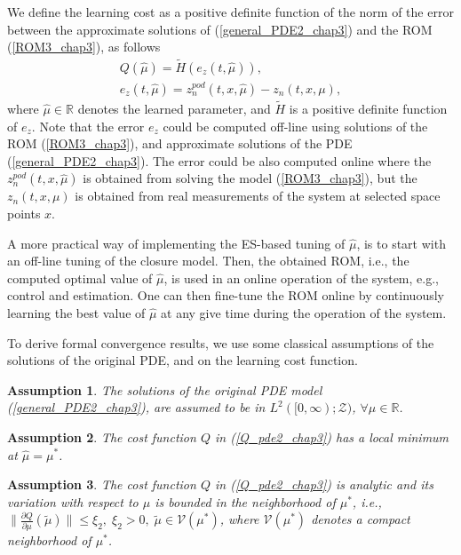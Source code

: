 \documentclass[letterpaper,conference,onecolumn,11pt]{IEEEtran}
\newtheorem{assumption}{Assumption}
\begin{document}
We define the learning cost as a positive definite function of the
norm of the error between the approximate solutions of
(\ref{general_PDE2_chap3}) and the ROM (\ref{ROM3_chap3}), as follows
\begin{equation}\label{Q_pde2_chap3}
\begin{array}{l}
Q(\hat\mu)=\tilde{H}(e_{z}(t,\hat \mu)),\\
e_{z}(t,\hat{\mu})=z_n^{pod}(t,x,\hat{\mu})-z_n(t,x,\mu),
\end{array}
\end{equation}
where $\hat\mu\in\mathbb{R}$ denotes the learned parameter, and
$\tilde{H}$ is a positive definite function of $e_{z}$. Note that the
error $e_{z}$ could be computed off-line using solutions of the ROM
(\ref{ROM3_chap3}), and approximate solutions of the PDE
(\ref{general_PDE2_chap3}). The error could be also computed online
where the $z_n^{pod}(t,x,\hat{\mu})$ is obtained from solving the
model (\ref{ROM3_chap3}), but the $z_n(t,x,\mu)$ is obtained from real
measurements of the system at selected space points $x$.

A more practical way of implementing the ES-based tuning of
$\hat\mu$, is to start with an off-line tuning of the closure
model. Then, the obtained ROM, i.e., the computed optimal value of
$\hat\mu$, is used in an online operation of the system, e.g.,
control and estimation. One can then fine-tune the ROM online by
continuously learning the best value of $\hat\mu$ at any give time
during the operation of the system.

To derive formal convergence results, we use some classical
assumptions of the solutions of the original PDE, and on the learning
cost function.
\begin{assumption}\label{pdestab_assumption1_chap3}
The solutions of the original PDE model
(\ref{general_PDE2_chap3}), are assumed to be in
$L^{2}([0,\infty);\mathcal{Z})$, $\forall\mu\in\mathbb{R}$.
\end{assumption}
\begin{assumption} \label{robustmesass1_pdestab_chap3}
The cost function $Q$ in (\ref{Q_pde2_chap3}) has a local minimum
at $\hat\mu= \mu^{*}$.
\end{assumption}
\begin{assumption} \label{robustmesass2_pdestab_chap3}
The cost function $Q$ in (\ref{Q_pde2_chap3}) is analytic and its
variation with respect to $\mu$ is bounded in the neighborhood of
$\mu^{*}$, i.e., $\|\frac{\partial{Q}}{\partial
\mu}({\tilde{\mu}})\|\leq\xi_{2},\;\xi_{2}>0,
\;\tilde{\mu}\in\mathcal{V}(\mu^{*})$, where
$\mathcal{V}(\mu^{*})$ denotes a compact neighborhood of
$\mu^{*}$.
\end{assumption}
\end{document}
